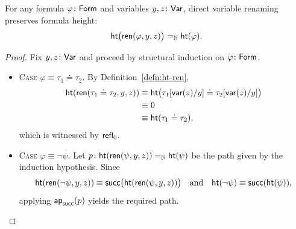 \begin{lem}\label{lem:ren-preserves-ht}
    For any formula\/ $\varphi\colon\fun{Form}$ and variables\/ $y,z\colon\fun{Var}$, direct variable renaming preserves formula height:
    \[
        \mathsf{ht}\bigl(
            \mathsf{ren}(\varphi,y,z)
        \bigr)
        \mathrel{=_{\mathbb{N}}}
        \mathsf{ht}(\varphi).
    \]
\end{lem}

\begin{proof}
    Fix $y,z\colon\fun{Var}$ and proceed by structural induction on $\varphi\colon\fun{Form}$.
        \begin{itemize}
        \item \textsc{Case} $\varphi\equiv\tau_1\doteq\tau_2$. By Definition~\ref{defn:ht-ren},
        \begin{align*}
            \mathsf{ht}(
                \mathsf{ren}(\tau_1\doteq\tau_2,y,z)
            )
                &\equiv\mathsf{ht}\bigl(
                    \tau_1[\mathsf{var}(z)/y]
                    \doteq
                    \tau_2[\mathsf{var}(z)/y]
                \bigr)\\
                &\equiv0\\
                &\equiv\mathsf{ht}(\tau_1\doteq\tau_2),
        \end{align*}
        which is witnessed by $\mathsf{refl}_0$.
        
        \item \textsc{Case} $\varphi\equiv\neg\psi$. Let $p\colon\fun{ht}(\fun{ren}(\psi,y,z))\eq\N\fun{ht}(\psi)$ be the path given by the induction hypothesis. Since
        \[
            \mathsf{ht}(
                \mathsf{ren}(\neg\psi,y,z)
            )
            \equiv\mathsf{succ}\bigl(
                \mathsf{ht}(\mathsf{ren}(\psi,y,z))
            \bigr)
            \quad\text{and}\quad
            \mathsf{ht}(\neg\psi)
            \equiv\mathsf{succ}(\mathsf{ht}(\psi)),
        \]
        applying $\mathsf{ap}_{\mathsf{succ}}(p)$ yields the required path.
        

\end{itemize}
\end{proof}
